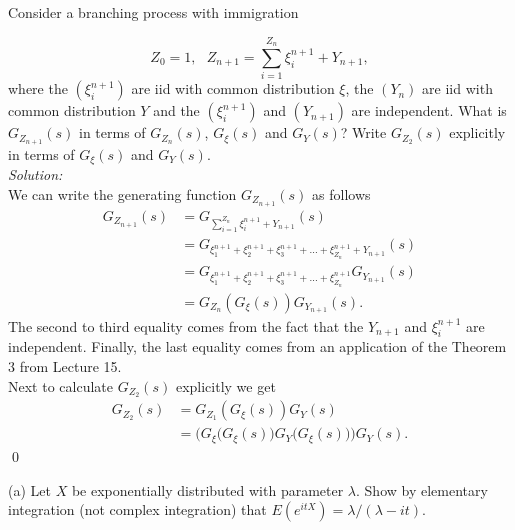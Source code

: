 \documentclass[10pt]{amsart}
\begin{document}
\newpage

 Consider a branching process with immigration

$$Z_0 = 1, \,\,\,\,Z_{n+1} = \sum_{i=1}^{Z_n}  \xi^{n+1}_i + Y_{n+1},$$
where the $(\xi^{n+1}_i)$ are iid with common distribution $\xi$, the $(Y_n)$ are iid with common distribution $Y$ and
the $(\xi^{n+1}_i)$ and $(Y_{n+1})$ are independent. What is $G_{Z_{n+1}}(s)$ in terms of $G_{Z_n}(s)$, $G_{\xi}(s)$ and $G_Y(s)$? Write $G_{Z_2}(s)$ explicitly in terms of $G_\xi(s)$ and $G_Y(s)$. \\

\noindent
\textit{Solution:} \\
We can write the generating function $G_{Z_{n + 1}}(s)$ as follows
\begin{align*}
G_{Z_{n+1}}(s) &=  G_{\sum_{i=1}^{Z_n}  \xi^{n+1}_i + Y_{n+1}}(s) \\
	&=  G_{ \xi^{n+1}_1 + \xi^{n+1}_2 + \xi^{n+1}_3 + ... + \xi^{n+1}_{Z_n} + Y_{n+1}}(s) \\
	&=  G_{ \xi^{n+1}_1 + \xi^{n+1}_2 + \xi^{n+1}_3 + ... + \xi^{n+1}_{Z_n}} G_{Y_{n+1}}(s) \\
	&=  G_{ Z_n}(G_{\xi}(s)) G_{Y_{n+1}}(s).
\end{align*}
The second to third equality comes from the fact that the $Y_{n + 1}$ and $\xi_i^{n + 1}$ are independent.
Finally, the last equality comes from an application of the Theorem 3 from Lecture 15. \\

\noindent
Next to calculate $G_{Z_2}(s)$ explicitly we get
\begin{align*}
G_{Z_2}(s)
	&= G_{Z_1}(G_{\xi}(s))G_Y(s) \\
	&= \bigg(G_{\xi}\Big(G_{\xi}(s)\Big)G_Y\Big(G_{\xi}(s)\Big)\bigg)G_Y(s).
\end{align*}
\qed

\newpage

 (a) Let $X$ be exponentially distributed with parameter $\lambda$. Show by elementary integration (not complex integration) that $E(e^{itX}) = \lambda/(\lambda-i t)$.
\\
\end{document}
